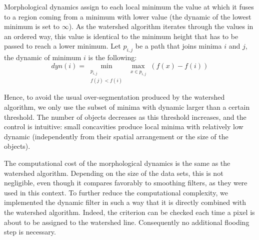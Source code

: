 Morphological dynamics assign to each local minimum the value at which
it fuses to a region coming from a minimum with lower value (the
dynamic of the lowest minimum is set to $\infty$). As the watershed
algorithm iterates through the values in an ordered way, this value is
identical to the minimum height that has to be passed to reach a lower
minimum. Let $p_{i,j}$ be a path that joins minima $i$ and $j$, the dynamic of minimum $i$ is the following:
\[ dyn(i) = \min_{\substack{p_{i,j} \\ f (j)<f (i)}} \max_{\substack{x\in p_{i,j}}} (f(x) - f(i))\]

Hence, to avoid the usual over-segmentation produced by the watershed
algorithm, we only use the subset of minima with dynamic larger than a
certain threshold. The number of objects decreases as this threshold
increases, and the control is intuitive: small concavities produce
local minima with relatively low dynamic (independently from their
spatial arrangement or the size of the objects). 

The computational cost of the morphological dynamics is the same as
the watershed algorithm. Depending on the size of the data sets, this
is not negligible, even though it compares favorably to 
smoothing filters, as they were used in this context. To further reduce the
computational complexity, we implemented the dynamic filter in such a way that it is directly
combined with the watershed algorithm. Indeed, the criterion can be checked each
time a pixel is about to be assigned to the watershed line. Consequently no additional flooding step is necessary. 

%

